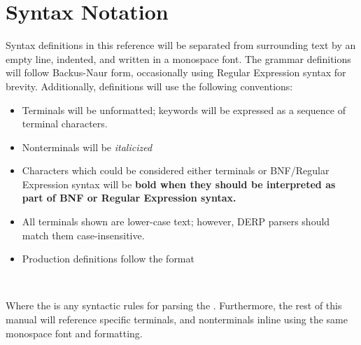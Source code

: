 \section{Syntax Notation}
Syntax definitions in this reference will be separated from surrounding text by an empty line, 
indented, and written in a monospace font. The grammar definitions will follow Backus-Naur form, 
occasionally using Regular Expression syntax for brevity. Additionally, definitions will use the following conventions:
\begin{itemize}
\item Terminals will be unformatted; keywords will be expressed as a sequence of terminal characters.
\item Nonterminals will be \textit{italicized}
\item Characters which could be considered either terminals or BNF/Regular Expression syntax will be \bf{bold} when they should be interpreted as part of BNF or Regular Expression syntax.
\item All terminals shown are lower-case text; however, DERP parsers should match them case-insensitive.
\item Production definitions follow the format
\begin{center}
 \\
\end{center}
\end{itemize}

Where the  is any syntactic rules for parsing the .
Furthermore,  the rest of this manual will reference specific terminals, and nonterminals inline using the same monospace font and formatting.
